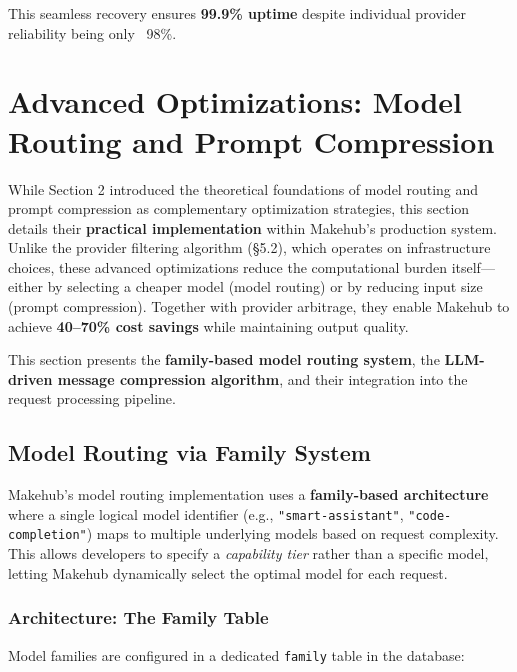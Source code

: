 \documentclass[english]{article}
\begin{document}
This seamless recovery ensures \textbf{99.9\% uptime} despite individual provider reliability being only ~98\%.


\newpage
\section{Advanced Optimizations: Model Routing and Prompt Compression}

While Section 2 introduced the theoretical foundations of model routing and prompt compression as complementary optimization strategies, this section details their \textbf{practical implementation} within Makehub's production system. Unlike the provider filtering algorithm (§5.2), which operates on infrastructure choices, these advanced optimizations reduce the computational burden itself—either by selecting a cheaper model (model routing) or by reducing input size (prompt compression). Together with provider arbitrage, they enable Makehub to achieve \textbf{40--70\% cost savings} while maintaining output quality.

This section presents the \textbf{family-based model routing system}, the \textbf{LLM-driven message compression algorithm}, and their integration into the request processing pipeline.

\subsection{Model Routing via Family System}

Makehub's model routing implementation uses a \textbf{family-based architecture} where a single logical model identifier (e.g., \texttt{"smart-assistant"}, \texttt{"code-completion"}) maps to multiple underlying models based on request complexity. This allows developers to specify a \emph{capability tier} rather than a specific model, letting Makehub dynamically select the optimal model for each request.

\subsubsection{Architecture: The Family Table}

Model families are configured in a dedicated \texttt{family} table in the database:
\end{document}
